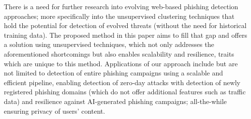 There is a need for further research into evolving web-based phishing detection approaches; more specifically into the unsupervised clustering techniques that hold the potential for detection of evolved threats (without the need for historical training data). The proposed method in this paper aims to fill that gap and offers a solution using unsupervised techniques, which not only addresses the aforementioned shortcomings but also enables scalability and resilience, traits which are unique to this method. Applications of our approach include but are not limited to detection of entire phishing campaigns using a scalable and efficient pipeline, enabling detection of zero-day attacks with detection of newly registered phishing domains (which do not offer additional features such as traffic data) and resilience against AI-generated phishing campaigns; all-the-while ensuring privacy of users’ content.